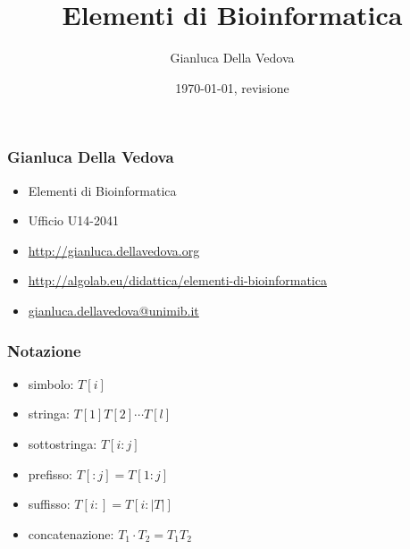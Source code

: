 \usepackage[italian]{babel}
\usepackage[utf8]{inputenc}
\usepackage{pgf}
\usepackage{verbatim}
\usepackage{inconsolata}
\usepackage{listings}

\usepackage{url}
\usepackage{xmpmulti}
\usepackage[T1]{fontenc}
\immediate{}


\author{Gianluca Della Vedova}
\title{Elementi di Bioinformatica}
\date{\today, {\tiny revisione \VCRevision}}



\beamerdefaultoverlayspecification{<+->}

\graphicspath{{figures/}}



\begin{frame}
  \titlepage
\end{frame}


\begin{frame}\frametitle{Gianluca Della Vedova}
\begin{itemize}
\item
Elementi di Bioinformatica
\item
Ufficio U14-2041
\item
\url{http://gianluca.dellavedova.org}
\item
\url{http://algolab.eu/didattica/elementi-di-bioinformatica}
\item
\url{gianluca.dellavedova@unimib.it}
\end{itemize}
\end{frame}

\begin{frame}[fragile]
\frametitle{Notazione}
\begin{itemize}
\item
\alert{simbolo}: $T[i]$\\
\item
\alert{stringa}: $T[1]T[2]\cdots T[l]$\\
\item
\alert{sottostringa}: $T[i:j]$\\
\item
\alert{prefisso}: $T[:j]=T[1:j]$\\
\item
\alert{suffisso}: $T[i:]=T[i:|T|]$
\item
\alert{concatenazione}: $T_{1}\cdot T_{2} = T_{1}T_{2}$
\end{itemize}
\end{frame}


